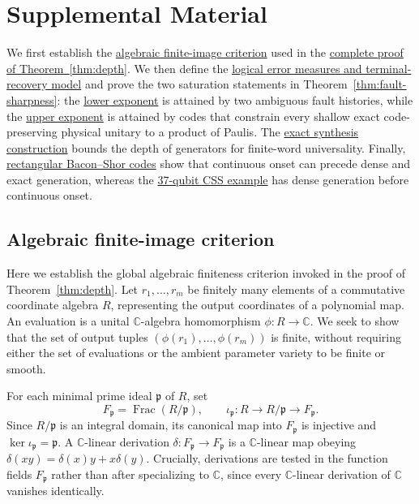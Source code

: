 \documentclass[aps,prl,reprint,notitlepage,nofootinbib,nobibnotes]{revtex4-2}
\newcommand{\onecolumngrid}{\onecolumn}
\begin{document}
\onecolumngrid
\clearpage
\setcounter{equation}{0}
\renewcommand{\theequation}{S\arabic{equation}}
\renewcommand{\theHequation}{S\arabic{equation}}
\setcounter{lemma}{0}
\renewcommand{\thelemma}{S\arabic{lemma}}
\setcounter{proposition}{0}
\renewcommand{\theproposition}{S\arabic{proposition}}
\section*{Supplemental Material}
We first establish the \hyperref[sm:algebraic-finite-image]{algebraic finite-image criterion} used
in the \hyperref[sm:proof-thm-depth]{complete proof of Theorem~\ref*{thm:depth}}. We then define
the \hyperref[sm:logical-error-measures]{logical error measures and terminal-recovery model} and
prove the two saturation statements in Theorem~\ref{thm:fault-sharpness}: the
\hyperref[em:lower-saturation]{lower exponent} is attained by two ambiguous fault histories, while
the \hyperref[em:upper-saturation]{upper exponent} is attained by codes that constrain every
shallow exact code-preserving physical unitary to a product of Paulis. The
\hyperref[sm:exact-synthesis]{exact synthesis construction} bounds the depth of generators for
finite-word universality. Finally, \hyperref[sm:bacon-shor]{rectangular Bacon--Shor codes} show
that continuous onset can precede dense and exact generation, whereas the
\hyperref[sm:dua-example]{37-qubit CSS example} has dense generation before continuous onset.
\subsection*{Algebraic finite-image criterion}
\label{sm:algebraic-finite-image}

Here we establish the global algebraic finiteness criterion invoked in the proof of
Theorem~\ref{thm:depth}. Let $r_1,\ldots,r_m$ be finitely many elements of a commutative coordinate
algebra $R$, representing the output coordinates of a polynomial map. An evaluation is a unital
$\mathbb C$-algebra homomorphism $\phi:R\to\mathbb C$. We seek to show that the set of output
tuples $(\phi(r_1),\ldots,\phi(r_m))$ is finite, without requiring either the set of evaluations or
the ambient parameter variety to be finite or smooth.

For each minimal prime ideal $\mathfrak p$ of $R$, set
\[
 F_{\mathfrak p}=\operatorname{Frac}(R/\mathfrak p),\qquad
 \iota_{\mathfrak p}:R\longrightarrow R/\mathfrak p
                         \longrightarrow F_{\mathfrak p}.
\]
Since $R/\mathfrak p$ is an integral domain, its canonical map into $F_{\mathfrak p}$ is injective
and $\ker\iota_{\mathfrak p}=\mathfrak p$. A $\mathbb C$-linear derivation $\delta:F_{\mathfrak
p}\to F_{\mathfrak p}$ is a $\mathbb C$-linear map obeying $\delta(xy)=\delta(x)y+x\delta(y)$.
Crucially, derivations are tested in the function fields $F_{\mathfrak p}$ rather than after
specializing to $\mathbb C$, since every $\mathbb C$-linear derivation of $\mathbb C$ vanishes
identically.
\end{document}
